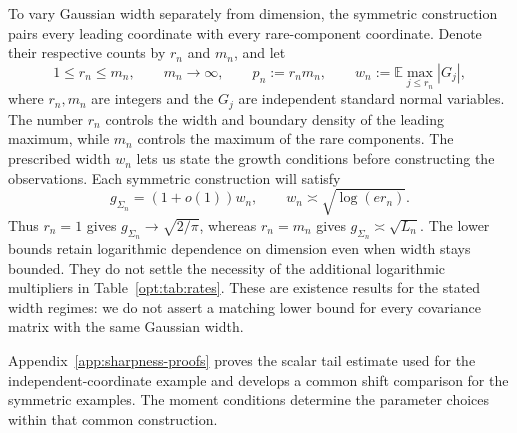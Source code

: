 \documentclass[11pt,letterpaper,twoside,leqno]{article}
\theoremstyle{bookplain}
\theoremstyle{bookremark}
\newcommand{\E}{\mathbb E}
\begin{document}
To vary Gaussian width separately from dimension, the symmetric
construction pairs every leading coordinate with every rare-component
coordinate. Denote their respective counts by $r_n$ and $m_n$, and let
\begin{equation}
 1\le r_n\le m_n,\qquad m_n\to\infty,\qquad p_n:=r_nm_n,
 \qquad w_n:=\E\max_{j\le r_n}|G_j|,
 \label{lower:eq:dimensions}
\end{equation}
where $r_n,m_n$ are integers and the $G_j$ are independent standard
normal variables. The number $r_n$ controls the width and boundary
density of the leading maximum, while $m_n$ controls the maximum
of the rare components. The prescribed width $w_n$ lets us state
the growth conditions before constructing the observations.
Each symmetric construction will satisfy
\begin{equation}
 g_{\Sigma_n}=(1+o(1))w_n,\qquad
 w_n\asymp\sqrt{\log(er_n)}.
 \label{lower:eq:width-profile}
\end{equation}
Thus $r_n=1$ gives $g_{\Sigma_n}\to\sqrt{2/\pi}$, whereas
$r_n=m_n$ gives $g_{\Sigma_n}\asymp\sqrt{L_n}$.
The lower bounds retain logarithmic dependence on dimension even
when width stays bounded. They do not settle the necessity of the
additional logarithmic multipliers in Table~\ref{opt:tab:rates}.
These are existence results for the stated width regimes: we do
not assert a matching lower bound for every covariance matrix
with the same Gaussian width.

Appendix~\ref{app:sharpness-proofs} proves the scalar tail estimate
used for the independent-coordinate example and develops a common
shift comparison for the symmetric examples. The moment conditions
determine the parameter choices within that common construction.
\end{document}
